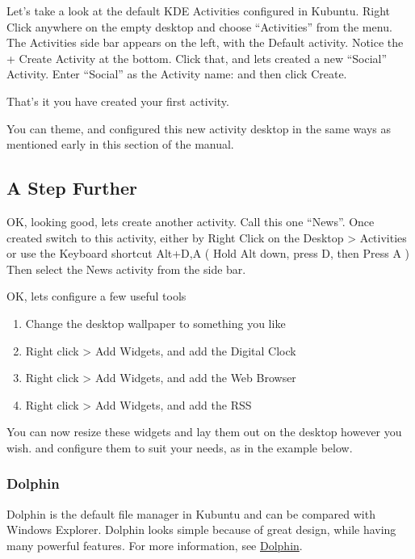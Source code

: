 \documentclass[letterpaper,10pt,english]{sphinxmanual}
\begin{document}
Let's take a look at the default KDE Activities configured in Kubuntu. Right Click anywhere on the empty desktop and choose ``Activities'' from the menu. The Activities side bar appears on the left, with the Default activity. Notice the + Create Activity at the bottom. Click that, and lets created a new ``Social'' Activity.
Enter ``Social'' as the Activity name: and then click Create.

That's it you have created your first activity.

You can theme, and configured this new activity desktop in the same ways as mentioned early in this section of the manual.


\subsection{A Step Further}
\label{\detokenize{docs/basic:a-step-further}}
OK, looking good, lets create another activity. Call this one ``News''. Once created switch to this activity, either by Right Click on the Desktop \textgreater{} Activities or use the Keyboard shortcut Alt+D,A ( Hold Alt down, press D, then Press A )
Then select the News activity from the side bar.

OK, lets configure a few useful tools
\begin{enumerate}
\item {} 
Change the desktop wallpaper to something you like

\item {} 
Right click \textgreater{} Add Widgets, and add the Digital Clock

\item {} 
Right click \textgreater{} Add Widgets, and add the Web Browser

\item {} 
Right click \textgreater{} Add Widgets, and add the RSS

\end{enumerate}

You can now resize these widgets and lay them out on the desktop however you wish. and configure them to suit your needs, as in the example below.



\subsubsection{Dolphin}
\label{\detokenize{docs/basic:dolphin}}
Dolphin is the default file manager in Kubuntu and can be compared with Windows Explorer. Dolphin looks simple because of great design, while having many powerful features. For more information, see \href{https://userbase.kde.org/Special:MyLanguage/Dolphin}{Dolphin}.
\end{document}
